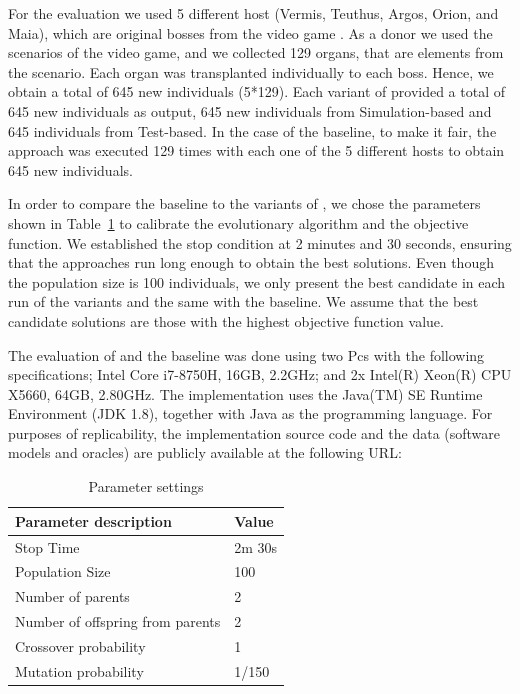 For the evaluation we used 5 different host (Vermis, Teuthus, Argos, Orion, and Maia), which are original bosses from the video game \CaseStudy{}. As a donor we used the scenarios of the video game, and we collected 129 organs, that are elements from the scenario. Each organ was transplanted individually to each boss. Hence, we obtain a total of 645 new individuals (5*129). Each variant of \ApproachName{} provided a total of 645 new individuals as output, 645 new individuals from Simulation-based and 645 individuals from Test-based. In the case of the baseline, to make it fair, the approach was executed 129 times with each one of the 5 different hosts to obtain 645 new individuals.

In order to compare the baseline to the variants of \ApproachName{}, we chose the parameters shown in Table~\ref{tab:evaluation_parameters} to calibrate the evolutionary algorithm and the objective function. We established the stop condition at 2 minutes and 30 seconds, ensuring that the approaches run long enough to obtain the best solutions. Even though the population size is 100 individuals, we only present the best candidate in each run of the variants and the same with the baseline. We assume that the best candidate solutions are those with the highest objective function value.

The evaluation of \ApproachName{} and the baseline was done
using two Pcs with the following specifications; Intel Core i7-8750H, 16GB, 2.2GHz; and  2x Intel(R) Xeon(R) CPU X5660, 64GB, 2.80GHz.
The implementation uses the Java(TM) SE Runtime Environment (JDK 1.8), together with Java as the programming language. 
For purposes of replicability, the implementation source code and the data (software models and oracles) are publicly available at the following URL:

\begin{table}[h]
    \centering
    \begin{tabular}{ll}
        \hline
        \bf{Parameter description}            & \bf{Value}  \\ \hline
        Stop Time                        & 2m 30s \\
        Population Size                  & 100    \\
        Number of parents                & 2      \\
        Number of offspring from parents & 2      \\
        Crossover probability            & 1      \\
        Mutation probability             & 1/150 \\ \hline
    \end{tabular}
    \caption{Parameter settings}
    \label{tab:evaluation_parameters}
    \end{table}

